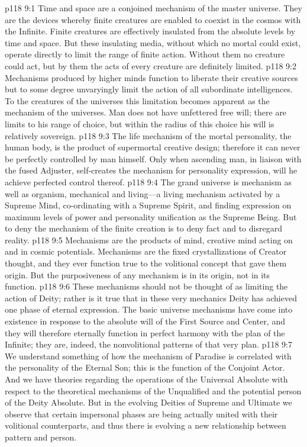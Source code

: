 \vs p118 9:1 Time and space are a conjoined mechanism of the master universe. They are the devices whereby finite creatures are enabled to coexist in the cosmos with the Infinite. Finite creatures are effectively insulated from the absolute levels by time and space. But these insulating media, without which no mortal could exist, operate directly to limit the range of finite action. Without them no creature could act, but by them the acts of every creature are definitely limited.
\vs p118 9:2 Mechanisms produced by higher minds function to liberate their creative sources but to some degree unvaryingly limit the action of all subordinate intelligences. To the creatures of the universes this limitation becomes apparent as the mechanism of the universes. Man does not have unfettered free will; there are limits to his range of choice, but within the radius of this choice his will is relatively sovereign.
\vs p118 9:3 The life mechanism of the mortal personality, the human body, is the product of supermortal creative design; therefore it can never be perfectly controlled by man himself. Only when ascending man, in liaison with the fused Adjuster, self\hyp{}creates the mechanism for personality expression, will he achieve perfected control thereof.
\vs p118 9:4 The grand universe is mechanism as well as organism, mechanical and living---a living mechanism activated by a Supreme Mind, co\hyp{}ordinating with a Supreme Spirit, and finding expression on maximum levels of power and personality unification as the Supreme Being. But to deny the mechanism of the finite creation is to deny fact and to disregard reality.
\vs p118 9:5 Mechanisms are the products of mind, creative mind acting on and in cosmic potentials. Mechanisms are the fixed crystallizations of Creator thought, and they ever function true to the volitional concept that gave them origin. But the purposiveness of any mechanism is in its origin, not in its function.
\vs p118 9:6 These mechanisms should not be thought of as limiting the action of Deity; rather is it true that in these very mechanics Deity has achieved one phase of eternal expression. The basic universe mechanisms have come into existence in response to the absolute will of the First Source and Center, and they will therefore eternally function in perfect harmony with the plan of the Infinite; they are, indeed, the nonvolitional patterns of that very plan.
\vs p118 9:7 We understand something of how the mechanism of Paradise is correlated with the personality of the Eternal Son; this is the function of the Conjoint Actor. And we have theories regarding the operations of the Universal Absolute with respect to the theoretical mechanisms of the Unqualified and the potential person of the Deity Absolute. But in the evolving Deities of Supreme and Ultimate we observe that certain impersonal phases are being actually united with their volitional counterparts, and thus there is evolving a new relationship between pattern and person.\plusone
